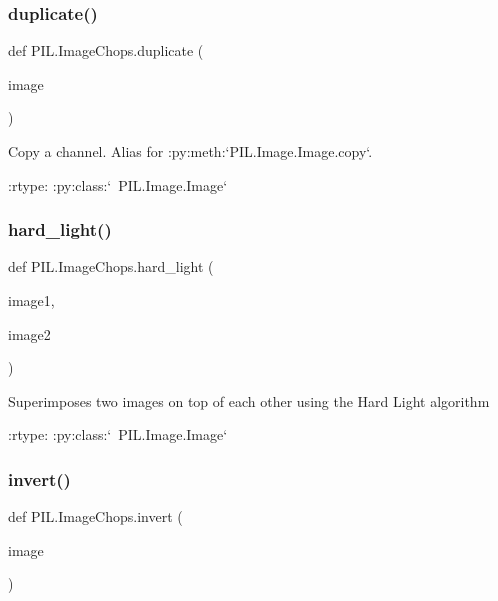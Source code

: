 \subsubsection{\texorpdfstring{duplicate()}{duplicate()}}
{\footnotesize\ttfamily def P\+I\+L.\+Image\+Chops.\+duplicate (\begin{DoxyParamCaption}\item[{}]{image }\end{DoxyParamCaption})}

\begin{DoxyVerb}Copy a channel. Alias for :py:meth:`PIL.Image.Image.copy`.

:rtype: :py:class:`~PIL.Image.Image`
\end{DoxyVerb}
 \mbox{\label{namespacePIL_1_1ImageChops_a4e4ba02de8192166c79530e57868b914}} 
\subsubsection{\texorpdfstring{hard\+\_\+light()}{hard\_light()}}
{\footnotesize\ttfamily def P\+I\+L.\+Image\+Chops.\+hard\+\_\+light (\begin{DoxyParamCaption}\item[{}]{image1,  }\item[{}]{image2 }\end{DoxyParamCaption})}

\begin{DoxyVerb}Superimposes two images on top of each other using the Hard Light algorithm

:rtype: :py:class:`~PIL.Image.Image`
\end{DoxyVerb}
 \mbox{\label{namespacePIL_1_1ImageChops_a0d9f80a2da4f82856acd12cba51c05ae}} 
\subsubsection{\texorpdfstring{invert()}{invert()}}
{\footnotesize\ttfamily def P\+I\+L.\+Image\+Chops.\+invert (\begin{DoxyParamCaption}\item[{}]{image }\end{DoxyParamCaption})}


